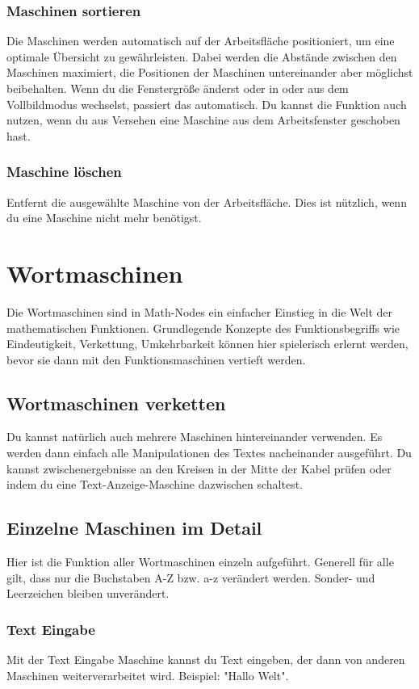 \documentclass[12pt]{report}
\begin{document}
\subsubsection{Maschinen sortieren}
Die Maschinen werden automatisch auf der Arbeitsfläche positioniert, um eine optimale Übersicht zu gewährleisten. Dabei werden die Abstände zwischen den Maschinen maximiert, die Positionen der Maschinen untereinander aber möglichst beibehalten. Wenn du die Fenstergröße änderst oder in oder aus dem Vollbildmodus wechselst, passiert das automatisch. Du kannst die Funktion auch nutzen, wenn du aus Versehen eine Maschine aus dem Arbeitsfenster geschoben hast.
\subsubsection{Maschine löschen}
Entfernt die ausgewählte Maschine von der Arbeitsfläche. Dies ist nützlich, wenn du eine Maschine nicht mehr benötigst.
\section{Wortmaschinen}
Die Wortmaschinen sind in Math-Nodes ein einfacher Einstieg in die Welt der mathematischen Funktionen. Grundlegende Konzepte des Funktionsbegriffs wie Eindeutigkeit, Verkettung, Umkehrbarkeit können hier spielerisch erlernt werden, bevor sie dann mit den Funktionsmaschinen vertieft werden. 
\subsection{Wortmaschinen verketten}
Du kannst natürlich auch mehrere Maschinen hintereinander verwenden. Es werden dann einfach alle Manipulationen des Textes nacheinander ausgeführt. Du kannst zwischenergebnisse an den Kreisen in der Mitte der Kabel prüfen oder indem du eine Text-Anzeige-Maschine dazwischen schaltest.
\subsection{Einzelne Maschinen im Detail}
Hier ist die Funktion aller Wortmaschinen einzeln aufgeführt. Generell für alle gilt, dass nur die Buchstaben A-Z bzw. a-z verändert werden. Sonder- und Leerzeichen bleiben unverändert.
\subsubsection{Text Eingabe}
Mit der Text Eingabe Maschine kannst du Text eingeben, der dann von anderen Maschinen weiterverarbeitet wird. Beispiel: "Hallo Welt".
\end{document}

